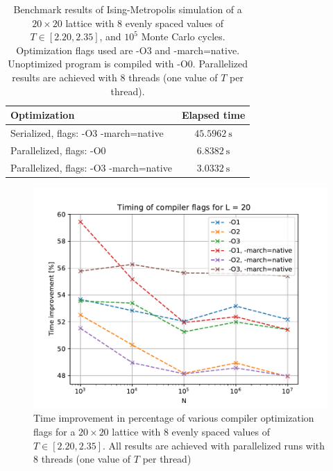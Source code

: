 \documentclass[reprint,english,notitlepage]{revtex4-1}  %
\begin{document}
\begin{table}[H]
	\centering
	\begin{tabular}{|l|c|}
		\hline
		Optimization & Elapsed time \\
		\hline
		Serialized, flags: -O3 -march=native & \(\SI{45.5962}{\second}\) \\
		Parallelized, flags: -O0 & \(\SI{6.8382}{\second}\) \\
		Parallelized, flags: -O3 -march=native & \(\SI{3.0332}{\second}\) \\
		\hline
	\end{tabular}
	\caption{Benchmark results of Ising-Metropolis simulation of a \(20\times 20\) lattice with \(8\) evenly spaced values of \(T \in [2.20, 2.35]\), and \(10^{5}\) Monte Carlo cycles. Optimization flags used are -O3 and -march=native. Unoptimized program is compiled with -O0. Parallelized results are achieved with \(8\) threads (one value of \(T\) per thread).} \label{table:benchmark_parallel}
\end{table}



\begin{figure}[H]
	\centering
	\includegraphics[width=\columnwidth]{../data/benchmark.pdf}
	\caption{Time improvement in percentage of various compiler optimization flags for a \(20\times 20\) lattice with \(8\) evenly spaced values of \(T \in [2.20, 2.35]\). All results are achieved with parallelized runs with \(8\) threads (one value of \(T\) per thread)} \label{fig:benchmark_compiler_flags}
\end{figure}
\end{document}
